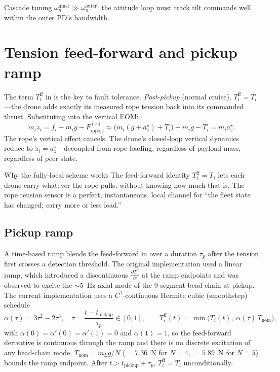 \documentclass[11pt,a4paper,oneside]{report}
\newcommand{\rope}{\text{rope}}
\begin{document}
\begin{insight}{Cascade tuning}
$\omega_n^\text{inner} \gg \omega_n^\text{outer}$: the attitude loop
must track tilt commands well within the outer PD's bandwidth.
\end{insight}

\section{Tension feed-forward and pickup ramp}
\label{sec:tff}

The term $T_i^\text{ff}$ in  is the key to fault
tolerance. \emph{Post-pickup} (normal cruise),
$T_i^\text{ff} = T_i$---the drone adds exactly its measured rope
tension back into its commanded thrust. Substituting into the vertical
EOM:
\begin{equation}
m_i \ddot z_i = f_i - m_i g - F_{\rope,i}^{(z)}
\approx
\big(m_i(g+a_z^\star)+T_i\big) - m_i g - T_i = m_i a_z^\star.
\end{equation}
The rope's vertical effect cancels. The drone's closed-loop vertical
dynamics reduce to $\ddot z_i = a_z^\star$---decoupled from rope
loading, regardless of payload mass, regardless of peer state.

\begin{insight}{Why the fully-local scheme works}
The feed-forward identity $T_i^\text{ff}=T_i$ lets each drone carry
whatever the rope pulls, without knowing how much that is. The rope
tension sensor is a perfect, instantaneous, local channel for
``the fleet state has changed; carry more or less load.''
\end{insight}

\subsection{Pickup ramp}
A time-based ramp blends the feed-forward in over a duration
$\tau_p$ after the tension first crosses a detection threshold. The
original implementation used a linear ramp, which introduced a
discontinuous $\frac{\partial T_i^\text{ff}}{\partial t}$ at the ramp
endpoints and was observed to excite the $\sim5$~Hz axial mode of the
9-segment bead-chain at pickup. The current implementation uses a
$C^1$-continuous Hermite cubic (smoothstep) schedule
\begin{equation}
\alpha(\tau) = 3\tau^2 - 2\tau^3,\quad
\tau = \frac{t-t_\text{pickup}}{\tau_p}\in[0,1],
\qquad
T_i^\text{ff}(t) = \min\!\bigl(T_i(t),\; \alpha(\tau)\,T_\text{nom}\bigr),
\label{eq:pickup-ramp}
\end{equation}
with $\alpha(0)=\alpha'(0)=\alpha'(1)=0$ and $\alpha(1)=1$, so the
feed-forward derivative is continuous through the ramp and there is no
discrete excitation of any bead-chain mode. $T_\text{nom} = m_L g/N$
($=7.36$~N for $N=4$, $=5.89$~N for $N=5$) bounds the ramp endpoint.
After $t>t_\text{pickup}+\tau_p$, $T_i^\text{ff} = T_i$
unconditionally.
\end{document}

